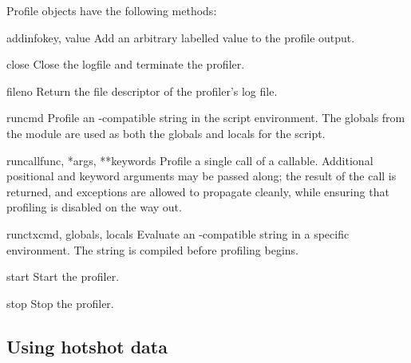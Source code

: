 Profile objects have the following methods:

\begin{methoddesc}[Profile]{addinfo}{key, value}
Add an arbitrary labelled value to the profile output.
\end{methoddesc}

\begin{methoddesc}[Profile]{close}{}
Close the logfile and terminate the profiler.
\end{methoddesc}

\begin{methoddesc}[Profile]{fileno}{}
Return the file descriptor of the profiler's log file.
\end{methoddesc}

\begin{methoddesc}[Profile]{run}{cmd}
Profile an -compatible string in the script environment.
The globals from the  module are used as
both the globals and locals for the script.
\end{methoddesc}

\begin{methoddesc}[Profile]{runcall}{func, *args, **keywords}
Profile a single call of a callable.
Additional positional and keyword arguments may be passed
along; the result of the call is returned, and exceptions are
allowed to propagate cleanly, while ensuring that profiling is
disabled on the way out.
\end{methoddesc}


\begin{methoddesc}[Profile]{runctx}{cmd, globals, locals}
Evaluate an -compatible string in a specific environment.
The string is compiled before profiling begins.
\end{methoddesc}

\begin{methoddesc}[Profile]{start}{}
Start the profiler.
\end{methoddesc}

\begin{methoddesc}[Profile]{stop}{}
Stop the profiler.
\end{methoddesc}


\subsection{Using hotshot data}


